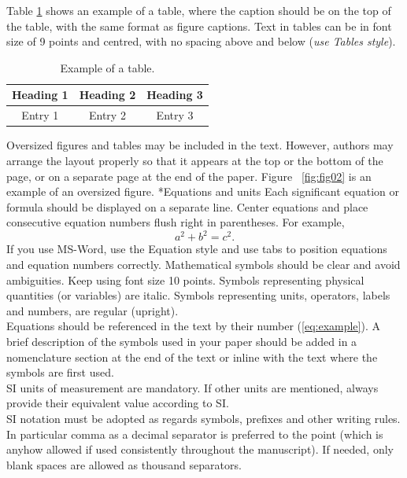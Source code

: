 \documentclass[twocolumn, a4paper,10pt]{article}
\makeatletter
\renewcommand\subsection{\@startsection{subsection}{1}{\z@}{\z@}{\z@}{\normalfont\normalsize\bfseries}}
\renewcommand\subsection{\@startsection{subsection}{1}{\z@}{\z@}{0.1pt}{\normalfont\normalsize\bfseries}}
\makeatother
\begin{document}
Table \ref{tab:tab01} shows an example of a table, where the caption should be on the top of the table, with the same format as figure captions. Text in tables can be in font size of 9 points and centred, with no spacing above and below (\textit{use Tables style}).
\begin{table}[ht]
\caption{Example of a table.}
\label{tab:tab01}
\centering
\begin{tabular}{| c | c | c | }
  \hline
  \bf{Heading 1} & \bf{Heading} 2 & \bf{Heading 3} \\
  \hline
  Entry 1 & Entry 2 & Entry 3 \\
  \hline
\end{tabular}
\vspace{-19pt}   %
\end{table}
Oversized figures and tables may be included in the text. However, authors may arrange the layout properly so that it appears at the top or the bottom of the page, or on a separate page at the end of the paper. Figure ~\ref{fig:fig02} is an example of an oversized figure.
\subsection*{Equations and units}
Each significant equation or formula should be displayed on a separate line. Center equations and place consecutive equation numbers flush right in parentheses. For example,
\begin{equation}\label{eq:example}
  a^2+b^2=c^2.
\end{equation}
If you use MS-Word, use the Equation style and use tabs to position equations and equation numbers correctly.
Mathematical symbols should be clear and avoid ambiguities. Keep using font size 10 points. Symbols representing physical quantities (or variables) are italic. Symbols representing units, operators, labels and numbers, are regular (upright).\\
Equations should be referenced in the text by their number (\ref{eq:example}). A brief description of the symbols used in your paper should be added in a nomenclature section at the end of the text or inline with the text where the symbols are first used.\\
SI units of measurement are mandatory. If other units are mentioned, always provide their equivalent value according to SI.\\
SI notation must be adopted as regards symbols, prefixes and other writing rules. In particular comma as a decimal separator is preferred to the point (which is anyhow allowed if used consistently throughout the manuscript). If needed, only blank spaces are allowed as thousand separators.
\end{document}
